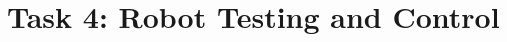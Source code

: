 \documentclass[15pt, a4paper, oneside]{report}
\begin{document}
\normalfont

\vspace*{5mm}

\section*{\Large Task 4: Robot Testing and Control}

\vspace{2mm}
    \Large
   
    
    
    
    
    

  
\vspace{1cm}
\end{document}
